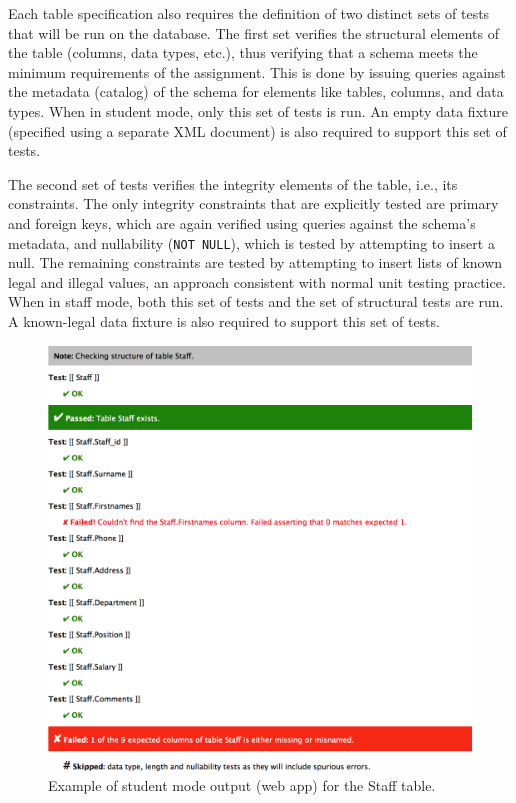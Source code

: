 \documentclass[sigconf, review, anonymous, capitalise]{acmart}
\begin{document}
Each table specification also requires the definition of two distinct sets of tests that will be run on the database. The first set verifies the structural elements of the table (columns, data types, etc.), thus verifying that a schema meets the minimum requirements of the assignment. This is done by issuing queries against the metadata (catalog) of the schema for elements like tables, columns, and data types. When in student mode, only this set of tests is run. An empty data fixture (specified using a separate XML document) is also required to support this set of tests.

The second set of tests verifies the integrity elements of the table, i.e., its constraints. The only integrity constraints that are explicitly tested are primary and foreign keys, which are again verified using queries against the schema's metadata, and nullability (\texttt{NOT NULL}), which is tested by attempting to insert a null. The remaining constraints are tested by attempting to insert lists of known legal and illegal values, an approach consistent with normal unit testing practice. When in staff mode, both this set of tests and the set of structural tests are run. A known-legal data fixture is also required to support this set of tests.


\begin{figure}
    \includegraphics[width=0.95\columnwidth,keepaspectratio]{images/web_output.png}
    \caption{Example of student mode output (web app) for the \textsf{Staff} table.}
    \label{fig-student-output}
\end{figure}
\end{document}
